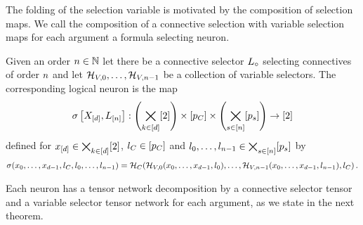 The folding of the selection variable is motivated by the composition of selection maps.
We call the composition of a connective selection with variable selection maps for each argument a formula selecting neuron.


\begin{definition}\label{def:fsNeuron}
	Given an order $n\in\mathbb{N}$ let there be a connective selector $L_{\circ}$ selecting connectives of order $n$ and let $\mathcal{H}_{V,0},\ldots,\mathcal{H}_{V,n-1}$ be a collection of variable selectors.
	The corresponding logical neuron is the map
	\begin{align*}
		\sigma\left[X_{[d]},L_{[n]}\right] 
		: \left(\bigtimes_{k\in[d]}[2]\right) \times [p_{C}] \times \left( \bigtimes_{s\in[n]} [p_{s}]\right) \rightarrow [2] 
	\end{align*}
	defined for $x_{[d]}\in\bigtimes_{k\in[d]}[2]$, $l_{C}\in[p_{C}]$ and
	$l_{0},\ldots,l_{n-1}\in \bigtimes_{s\in[n]} [p_{s}]$ by
	\begin{align*}
		\sigma({x_{0},\ldots,x_{d-1}}, l_{C}, l_{0},\ldots,l_{n-1}) =
		\mathcal{H}_{C}(\mathcal{H}_{V,0}({x_{0},\ldots,x_{d-1}}, l_{0}),\ldots,\mathcal{H}_{V,n-1}({x_{0},\ldots,x_{d-1}},l_{n-1}), l_{C}) \, .
	\end{align*}
\end{definition}

Each neuron has a tensor network decomposition by a connective selector tensor and a variable selector tensor network for each argument, as we state in the next theorem.

